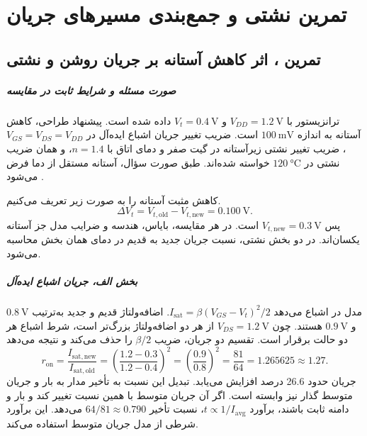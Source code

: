 \chapter*{تمرین نشتی و جمع‌بندی مسیرهای جریان}
\section*{تمرین ، اثر کاهش آستانه بر جریان روشن و نشتی}
\paragraph*{صورت مسئله و شرایط ثابت در مقایسه}
ترانزیستور  با \(V_{DD}=\qty{1.2}{\volt}\) و
\(V_t=\qty{0.4}{\volt}\) داده شده است. پیشنهاد طراحی، کاهش آستانه
به اندازه \(\qty{100}{\milli\volt}\) است. ضریب تغییر جریان اشباع
ایده‌آل در \(V_{GS}=V_{DS}=V_{DD}\)، ضریب تغییر نشتی زیرآستانه در
گیت صفر و دمای اتاق با \(n=1.4\)، و همان ضریب نشتی در
\(\qty{120}{\degreeCelsius}\) خواسته شده‌اند.
طبق صورت سؤال، آستانه مستقل از دما فرض می‌شود
\cite[تمرین ، صفحه ۹۶]{weste}.

کاهش مثبت آستانه را به صورت زیر تعریف می‌کنیم.
\[
 \Delta V_t=V_{t,\mathrm{old}}-V_{t,\mathrm{new}}
 =\qty{0.100}{\volt}.
\]
پس \(V_{t,\mathrm{new}}=\qty{0.3}{\volt}\) است.
در هر مقایسه، بایاس، هندسه و ضرایب مدل جز آستانه یکسان‌اند.
در دو بخش نشتی، نسبت جریان جدید به قدیم در دمای همان بخش محاسبه
می‌شود.

\paragraph*{بخش الف، جریان اشباع ایده‌آل}
مدل  در اشباع می‌دهد
\(I_{\mathrm{sat}}=\beta(V_{GS}-V_t)^2/2\).
اضافه‌ولتاژ قدیم و جدید به‌ترتیب
\(\qty{0.8}{\volt}\) و \(\qty{0.9}{\volt}\) هستند.
چون \(V_{DS}=\qty{1.2}{\volt}\) از هر دو اضافه‌ولتاژ بزرگ‌تر
است، شرط اشباع هر دو حالت برقرار است. تقسیم دو جریان، ضریب
\(\beta/2\) را حذف می‌کند و نتیجه می‌دهد
\begin{equation*}
 r_{\mathrm{on}}=
 \frac{I_{\mathrm{sat,new}}}{I_{\mathrm{sat,old}}}
 =\left(\frac{1.2-0.3}{1.2-0.4}\right)^2
 =\left(\frac{0.9}{0.8}\right)^2
 =\frac{81}{64}=1.265625\approx\boxed{1.27}.
\end{equation*}
جریان حدود \num{26.6} درصد افزایش می‌یابد. تبدیل این نسبت به
تأخیر مدار به بار و جریان متوسط گذار نیز وابسته است.
اگر آن جریان متوسط با همین نسبت تغییر کند و بار و دامنه ثابت باشند،
برآورد \(t\propto1/I_{\mathrm{avg}}\)، نسبت تأخیر
\(64/81\approx0.790\) می‌دهد. این برآورد شرطی از مدل جریان
متوسط استفاده می‌کند.

